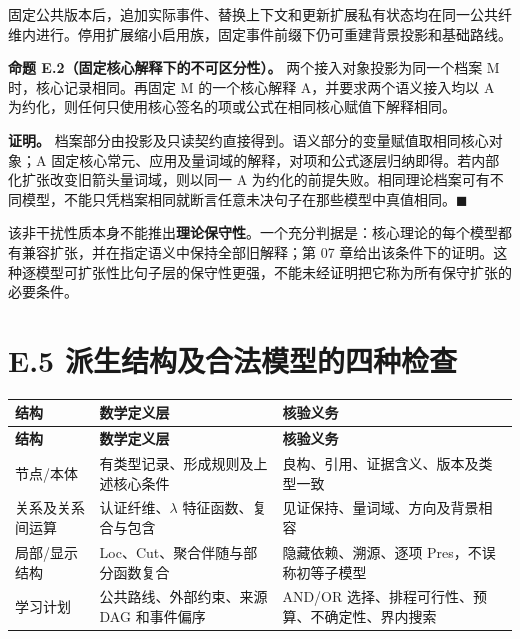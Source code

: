 \documentclass[UTF8,a4paper,zihao=-4,fontset=windows,openany]{ctexbook}
\newcommand{\mcsdisplay}[1]{%
  \par\addvspace{0.7em}%
  \sbox{\mcsmathbox}{\ensuremath{\displaystyle #1}}%
  \ifdim\wd\mcsmathbox>\linewidth
    \noindent\resizebox{\linewidth}{!}{\usebox{\mcsmathbox}}%
  \else
    \noindent\hspace*{\fill}\usebox{\mcsmathbox}\hspace*{\fill}%
  \fi
  \par\addvspace{0.7em}%
}
\def\ensuremath#1{#1}%
\begin{document}
\mcsdisplay{\pi_{\rm pub}(Z)=(M,L),
\qquad \pi_M(Z)=M.}
\noindent 固定公共版本后，追加实际事件、替换上下文和更新扩展私有状态均在同一公共纤维内进行。停用扩展缩小启用族，固定事件前缀下仍可重建背景投影和基础路线。

\textbf{命题 E.2（固定核心解释下的不可区分性）。} 两个接入对象投影为同一个档案 M 时，核心记录相同。再固定 M 的一个核心解释 A，并要求两个语义接入均以 A 为约化，则任何只使用核心签名的项或公式在相同核心赋值下解释相同。

\textbf{证明。} 档案部分由投影及只读契约直接得到。语义部分的变量赋值取相同核心对象；A 固定核心常元、应用及量词域的解释，对项和公式逐层归纳即得。若内部化扩张改变旧箭头量词域，则以同一 A 为约化的前提失败。相同理论档案可有不同模型，不能只凭档案相同就断言任意未决句子在那些模型中真值相同。\(\blacksquare\)

该非干扰性质本身不能推出\textbf{理论保守性}。一个充分判据是：核心理论的每个模型都有兼容扩张，并在指定语义中保持全部旧解释；第 07 章给出该条件下的证明。这种逐模型可扩张性比句子层的保守性更强，不能未经证明把它称为所有保守扩张的必要条件。

\section{E.5 派生结构及合法模型的四种检查}
\begingroup\small\setlength{\tabcolsep}{4pt}
\begin{longtable}{>{\raggedright\arraybackslash}p{}>{\raggedright\arraybackslash}p{}>{\raggedright\arraybackslash}p{}}
\toprule
\textbf{结构} & \textbf{数学定义层} & \textbf{核验义务} \\
\midrule
\endfirsthead
\toprule
\textbf{结构} & \textbf{数学定义层} & \textbf{核验义务} \\
\midrule
\endhead
\bottomrule
\endfoot
\bottomrule
\endlastfoot
节点/本体 & 有类型记录、形成规则及上述核心条件 & 良构、引用、证据含义、版本及类型一致 \\
关系及关系间运算 & 认证纤维、\(\lambda\) 特征函数、复合与包含 & 见证保持、量词域、方向及背景相容 \\
局部/显示结构 & Loc、Cut、聚合伴随与部分函数复合 & 隐藏依赖、溯源、逐项 Pres，不误称初等子模型 \\
学习计划 & 公共路线、外部约束、来源 DAG 和事件偏序 & AND/OR 选择、排程可行性、预算、不确定性、界内搜索 \\
\end{longtable}
\endgroup
\end{document}
